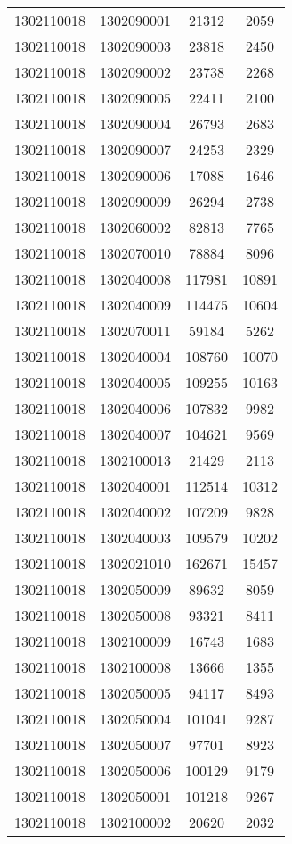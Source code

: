 \begin{longtable}{llcc}
1302110018 & 1302090001 & 21312 & 2059\\
1302110018 & 1302090003 & 23818 & 2450\\
1302110018 & 1302090002 & 23738 & 2268\\
1302110018 & 1302090005 & 22411 & 2100\\
1302110018 & 1302090004 & 26793 & 2683\\
1302110018 & 1302090007 & 24253 & 2329\\
1302110018 & 1302090006 & 17088 & 1646\\
1302110018 & 1302090009 & 26294 & 2738\\
1302110018 & 1302060002 & 82813 & 7765\\
1302110018 & 1302070010 & 78884 & 8096\\
1302110018 & 1302040008 & 117981 & 10891\\
1302110018 & 1302040009 & 114475 & 10604\\
1302110018 & 1302070011 & 59184 & 5262\\
1302110018 & 1302040004 & 108760 & 10070\\
1302110018 & 1302040005 & 109255 & 10163\\
1302110018 & 1302040006 & 107832 & 9982\\
1302110018 & 1302040007 & 104621 & 9569\\
1302110018 & 1302100013 & 21429 & 2113\\
1302110018 & 1302040001 & 112514 & 10312\\
1302110018 & 1302040002 & 107209 & 9828\\
1302110018 & 1302040003 & 109579 & 10202\\
1302110018 & 1302021010 & 162671 & 15457\\
1302110018 & 1302050009 & 89632 & 8059\\
1302110018 & 1302050008 & 93321 & 8411\\
1302110018 & 1302100009 & 16743 & 1683\\
1302110018 & 1302100008 & 13666 & 1355\\
1302110018 & 1302050005 & 94117 & 8493\\
1302110018 & 1302050004 & 101041 & 9287\\
1302110018 & 1302050007 & 97701 & 8923\\
1302110018 & 1302050006 & 100129 & 9179\\
1302110018 & 1302050001 & 101218 & 9267\\
1302110018 & 1302100002 & 20620 & 2032\\

\end{longtable}
